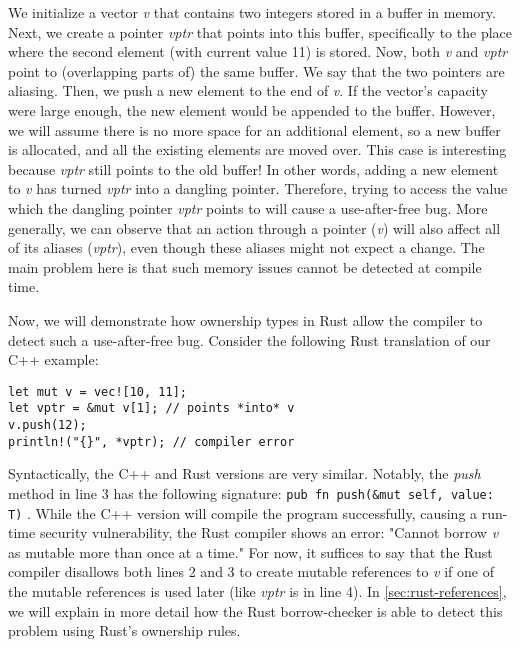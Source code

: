 \documentclass[sigplan,11pt,nonacm]{acmart}
\begin{document}
We initialize a vector \emph{v} that contains two integers stored in a buffer in memory.
Next, we create a pointer \emph{vptr} that points into this buffer, specifically to the place where the second element (with current value 11) is stored.
Now, both \emph{v} and \emph{vptr} point to (overlapping parts of) the same buffer.
We say that the two pointers are aliasing.
Then, we push a new element to the end of \emph{v}.
If the vector's capacity were large enough, the new element would be appended to the buffer.
However, we will assume there is no more space for an additional element, so a new buffer is allocated, and all the existing elements are moved over.
This case is interesting because \emph{vptr} still points to the old buffer!
In other words, adding a new element to \emph{v} has turned \emph{vptr} into a dangling pointer.
Therefore, trying to access the value which the dangling pointer \emph{vptr} points to will cause a use-after-free bug.
More generally, we can observe that an action through a pointer (\emph{v}) will also affect all of its aliases (\emph{vptr}), even though these aliases might not expect a change.
The main problem here is that such memory issues cannot be detected at compile time.


Now, we will demonstrate how ownership types in Rust allow the compiler to detect such a use-after-free bug.
Consider the following Rust translation of our C++ example:

\begin{lstlisting}
let mut v = vec![10, 11];
let vptr = &mut v[1]; // points *into* v
v.push(12);
println!("{}", *vptr); // compiler error
\end{lstlisting}

Syntactically, the C++ and Rust versions are very similar.
Notably, the \emph{push} method in line 3 has the following signature: \verb|pub fn push(&mut self, value: T)| \cite{rust-vector-documentation}.
While the C++ version will compile the program successfully, causing a run-time security vulnerability, the Rust compiler shows an error: "Cannot borrow \emph{v} as mutable more than once at a time."
For now, it suffices to say that the Rust compiler disallows both lines 2 and 3 to create mutable references to \emph{v} if one of the mutable references is used later (like \emph{vptr} is in line 4).
In \ref{sec:rust-references}, we will explain in more detail how the Rust borrow-checker is able to detect this problem using Rust's ownership rules.
\end{document}
